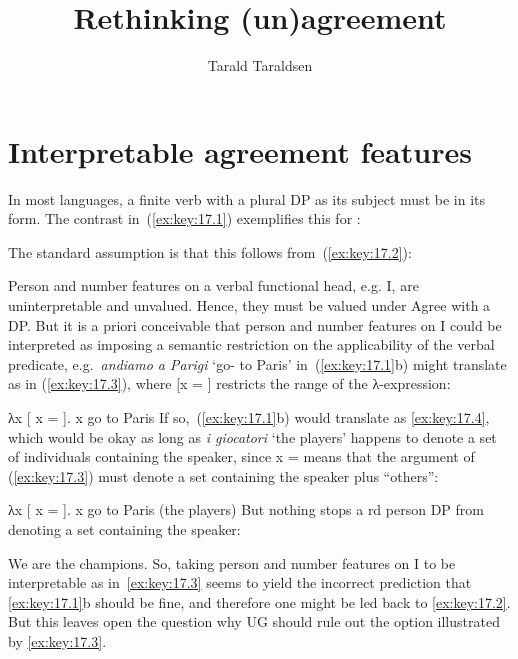 \documentclass[output=paper]{langsci/langscibook}
\author{Tarald Taraldsen}
\title{Rethinking (un)agreement}
\begin{document}
\glsresetall

\section{Interpretable agreement features}\label{sec:key:17.1}

In most languages, a finite verb with a plural DP as its subject must be in its
\Tpl{} form. The contrast in~(\ref{ex:key:17.1}) exemplifies this for :

\ea\label{ex:key:17.1} 
    \ea[]{%
    \gll I giocatori vanno a Parigi.\\
        the players go-\Tpl{} to Paris\\
    \glt}
    \z
\z
The standard assumption is that this follows from~(\ref{ex:key:17.2}):

\ea\label{ex:key:17.2}
    \ea Person and number features on a verbal functional head, e.g. I, are
    uninterpretable and unvalued.
    \ex Hence, they must be valued under Agree with a DP.
    \z
\z
But it is a priori conceivable that person and number features on I could be
interpreted as imposing a semantic restriction on the applicability of the
verbal predicate, e.g.\ \emph{andiamo a Parigi} ‘go-\Fpl{} to Paris’
in~(\ref{ex:key:17.1}b) might translate as in (\ref{ex:key:17.3}), where [x = \Fpl{}]
restricts the range of the λ-expression:

\ea\label{ex:key:17.3}
    λx [ x = \Fpl{}]. x go to Paris
\z
If so,~(\ref{ex:key:17.1}b) would translate as \eqref{ex:key:17.4}, which would be okay as long as
\emph{i giocatori} ‘the players’ happens to denote a set of individuals
containing the speaker, since x = \Fpl{} means that the argument of
(\ref{ex:key:17.3}) must denote a set containing the speaker plus “others”:

\ea\label{ex:key:17.4}
    λx [ x = \Fpl{}]. x go to Paris (the players)
\z
But nothing stops a \Third{}rd person DP from denoting a set containing the
speaker:

\ea\label{ex:key:17.5}
    We are the champions.
\z
So, taking person and number features on I to be interpretable as
in~\eqref{ex:key:17.3} seems to yield the incorrect prediction that \eqref{ex:key:17.1}b should be
fine, and therefore one might be led back to \eqref{ex:key:17.2}. But this leaves open the
question why UG should rule out the option illustrated by \eqref{ex:key:17.3}.
\end{document}
